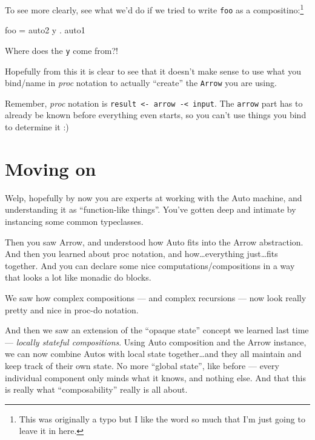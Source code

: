 \documentclass[]{article}
\newenvironment{Shaded}{}{}
\newcommand{\FunctionTok}[1]{\textcolor[rgb]{0.02,0.16,0.49}{{#1}}}
\newcommand{\NormalTok}[1]{{#1}}
\begin{document}
To see more clearly, see what we'd do if we tried to write \texttt{foo} as a
compositino:\footnote{This was originally a typo but I like the word so much
  that I'm just going to leave it in here.}

\begin{Shaded}
\begin{Highlighting}[]
\NormalTok{foo }\FunctionTok{=} \NormalTok{auto2 y }\FunctionTok{.} \NormalTok{auto1}
\end{Highlighting}
\end{Shaded}

Where does the \texttt{y} come from?!

Hopefully from this it is clear to see that it doesn't make sense to use what
you bind/name in \emph{proc} notation to actually ``create'' the \texttt{Arrow}
you are using.

Remember, \emph{proc} notation is
\texttt{result\ \textless{}-\ arrow\ -\textless{}\ input}. The \texttt{arrow}
part has to already be known before everything even starts, so you can't use
things you bind to determine it :)

\section{Moving on}\label{moving-on}

Welp, hopefully by now you are experts at working with the Auto machine, and
understanding it as ``function-like things''. You've gotten deep and intimate by
instancing some common typeclasses.

Then you saw Arrow, and understood how Auto fits into the Arrow abstraction. And
then you learned about proc notation, and how\ldots{}everything just\ldots{}fits
together. And you can declare some nice computations/compositions in a way that
looks a lot like monadic do blocks.

We saw how complex compositions --- and complex recursions --- now look really
pretty and nice in proc-do notation.

And then we saw an extension of the ``opaque state'' concept we learned last
time --- \emph{locally stateful compositions}. Using Auto composition and the
Arrow instance, we can now combine Autos with local state together\ldots{}and
they all maintain and keep track of their own state. No more ``global state'',
like before --- every individual component only minds what it knows, and nothing
else. And that this is really what ``composability'' really is all about.
\end{document}
